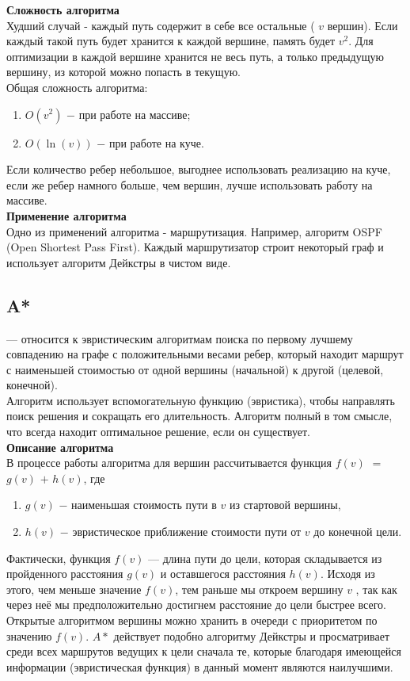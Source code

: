         \textbf{Сложность алгоритма}\\
        Худший случай - каждый путь содержит в себе все остальные ( $v$ вершин). Если каждый такой путь будет хранится к каждой вершине, память будет $v^2$. Для оптимизации в каждой вершине хранится не весь путь, а только предыдущую вершину, из которой можно попасть в текущую.\\

        Общая сложность алгоритма:
        \begin{enumerate}
            \item $O(v^2)$ $-$ при работе на массиве;
            \item $O(\ln(v))$ $-$ при работе на куче.
        \end{enumerate}
        Если количество ребер небольшое, выгоднее использовать реализацию на куче, если же ребер намного больше, чем вершин, лучше использовать работу на массиве.\\

        \textbf{Применение алгоритма}\\
        Одно из применений алгоритма - маршрутизация. Например, алгоритм OSPF (Open Shortest Pass First). Каждый маршрутизатор строит некоторый граф и использует алгоритм Дейкстры в чистом виде.

        
    \subsection{A*}
         — относится к эвристическим алгоритмам поиска по первому лучшему совпадению на графе с положительными весами ребер, который находит маршрут с наименьшей стоимостью от одной вершины (начальной) к другой (целевой, конечной).\\
        Алгоритм использует вспомогательную функцию (эвристика), чтобы направлять поиск решения и сокращать его длительность. Алгоритм полный в том смысле, что всегда находит оптимальное решение, если он существует.\\

        \textbf{Описание алгоритма}\\
        В процессе работы алгоритма для вершин рассчитывается функция $f(v)$ $=$ $g(v)$ $+$ $h(v)$, где
        \begin{enumerate}
            \item $g(v)$ $-$ наименьшая стоимость пути в $v$ из стартовой вершины,
            \item $h(v)$ $-$ эвристическое приближение стоимости пути от $v$ до конечной цели.
        \end{enumerate}
        Фактически, функция $f(v)$ — длина пути до цели, которая складывается из пройденного расстояния $g(v)$ и оставшегося расстояния $h(v)$. Исходя из этого, чем меньше значение $f(v)$,  тем раньше мы откроем вершину $v$ , так как через неё мы предположительно достигнем расстояние до цели быстрее всего. Открытые алгоритмом вершины можно хранить в очереди с приоритетом по значению $f(v)$. \textbf{$A*$} действует подобно алгоритму Дейкстры и просматривает среди всех маршрутов ведущих к цели сначала те, которые благодаря имеющейся информации (эвристическая функция) в данный момент являются наилучшими.

